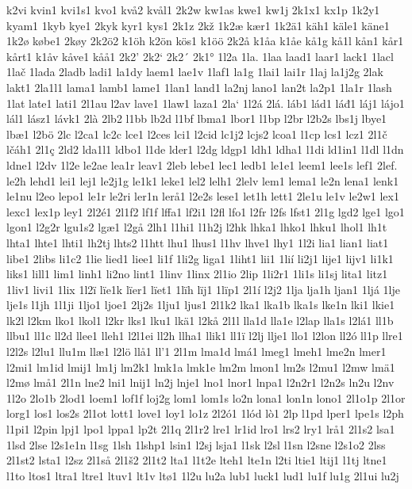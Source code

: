 k2vi
kvin1
kvi1s1
kvo1
kvå2
kvål1
2k2w
kw1as
kwe1
kw1j
2k1x1
kx1p
1k2y1
kyam1
1kyb
kye1
2kyk
kyr1
kys1
2k1z
2kž
1k2æ
kær1
1k2ä1
käh1
käle1
käne1
1k2ø
købe1
2køy
2k2ö2
k1öh
k2ön
kös1
k1öö
2k2å
k1åa
k1åe
kå1g
kå1l
kån1
kår1
kårt1
k1åv
kåve1
kåå1
2k2'
2k2`
2k2´
2k1°
1l2a
1la.
1laa
laad1
laar1
lack1
1lacl
1lač
1lada
2ladb
ladi1
la1dy
laem1
lae1v
1laf1
la1g
1lai1
lai1r
1laj
la1j2g
2lak
lakt1
2la1l1
lama1
lamb1
lame1
1lan1
land1
la2nj
lano1
lan2t
la2p1
1la1r
1lash
1lat
late1
lati1
2l1au
l2av
lave1
1law1
laza1
2la`
1l2á
2lá.
láb1
lád1
láđ1
láj1
lájo1
lál1
lász1
lávk1
2là
2lb2
l1bb
lb2d
l1bf
lbma1
lbor1
l1bp
l2br
l2b2s
lbs1j
lbye1
lbæ1
l2bö
2lc
l2ca1
lc2c
lce1
l2ces
lci1
l2cid
lc1j2
lcjs2
lcoa1
l1cp
lcs1
lcz1
2l1č
lčáh1
2l1ç
2ld2
lda1l1
ldbo1
l1de
lder1
l2dg
ldgp1
ldh1
ldha1
l1di
ld1in1
l1dl
l1dn
ldne1
l2dv
1l2e
le2ae
lea1r
leav1
2leb
lebe1
lec1
ledb1
le1e1
leem1
lee1s
lef1
2lef.
le2h
lehd1
lei1
lej1
le2j1g
le1k1
leke1
lel2
lelh1
2lelv
lem1
lema1
le2n
lena1
lenk1
le1nu
l2eo
lepo1
le1r
le2ri
ler1n
lerå1
l2e2s
lese1
let1h
lett1
2le1u
le1v
le2w1
lex1
lexc1
lex1p
ley1
2l2é1
2l1f2
lf1f
lffa1
lf2i1
l2fl
lfo1
l2fr
l2fs
lfst1
2l1g
lgd2
lge1
lgo1
lgon1
l2g2r
lgu1s2
lgæ1
l2gå
2lh1
l1hi1
l1h2j
l2hk
lhka1
lhko1
lhku1
lhol1
lh1t
lhta1
lhte1
lhti1
lh2tj
lhts2
l1htt
lhu1
lhus1
l1hv
lhve1
lhy1
1l2i
lia1
lian1
liat1
libe1
2libs
li1c2
1lie
lied1
liee1
li1f
1li2g
liga1
1liht1
lii1
1lií
li2j1
lije1
lijv1
li1k1
liks1
lill1
lim1
linh1
li2no
lint1
1linv
1linx
2l1io
2lip
1li2r1
1li1s
li1sj
lita1
litz1
1liv1
livi1
1lix
1l2ï
lïe1k
lïer1
lïet1
1lïh
lïj1
1lïp1
2l1í
l2j2
1lja
lja1h
ljan1
1ljá
1lje
lje1s
l1jh
1l1ji
1ljo1
ljoe1
2lj2s
1lju1
ljus1
2l1k2
lka1
lka1b
lka1s
lke1n
lki1
lkie1
lk2l
l2km
lko1
lkol1
l2kr
lks1
lku1
lkä1
l2kå
2l1l
lla1d
lla1e
l2lap
lla1s
l2lá1
ll1b
llbu1
ll1c
ll2d
llee1
lleh1
l2l1ei
ll2h
llha1
llik1
ll1ï
l2lj
llje1
llo1
l2lon
ll2ó
ll1p
llre1
l2l2s
l2lu1
llu1m
llæ1
l2lö
llå1
ll'1
2l1m
lma1d
lmá1
lmeg1
lmeh1
lme2n
lmer1
l2mi1
lm1id
lmij1
lm1j
lm2k1
lmk1a
lmk1e
lm2m
lmon1
lm2s
l2mu1
l2mw
lmä1
l2mø
lmå1
2l1n
lne2
lni1
lnij1
ln2j
lnje1
lno1
lnor1
lnpa1
l2n2r1
l2n2s
ln2u
l2nv
1l2o
2lo1b
2lod1
loem1
lof1f
loj2g
lom1
lom1s
lo2n
lona1
lon1n
lono1
2l1o1p
2l1or
lorg1
los1
los2s
2l1ot
lott1
love1
loy1
lo1z
2l2ó1
1lód
lò1
2lp
l1pd
lper1
lpe1s
l2ph
l1pi1
l2pin
lpj1
lpo1
lppa1
lp2t
2l1q
2l1r2
lre1
lr1id
lro1
lrs2
lry1
lrå1
2l1s2
lsa1
1lsd
2lse
l2s1e1n
l1sg
1lsh
1lshp1
lsin1
l2sj
lsja1
l1sk
l2sl
l1sn
l2sne
l2s1o2
2lss
2l1st2
lsta1
l2sz
2l1så
2l1š2
2l1t2
lta1
l1t2e
lteh1
lte1n
l2ti
ltie1
ltij1
l1tj
ltne1
l1to
ltos1
ltra1
ltre1
ltuv1
lt1v
ltø1
1l2u
lu2a
lub1
luck1
lud1
lu1f
lu1g
2l1ui
lu2j
